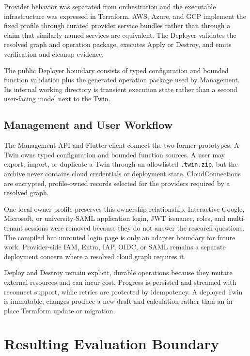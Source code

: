 Provider behavior was separated from orchestration and the executable
infrastructure was expressed in Terraform. AWS, Azure, and GCP implement the
fixed profile through curated provider service bundles rather than through a
claim that similarly named services are equivalent. The Deployer validates the
resolved graph and operation package, executes Apply or Destroy, and emits
verification and cleanup evidence.

The public Deployer boundary consists of typed configuration and bounded
function validation plus the generated operation package used by Management.
Its internal working directory is transient execution state rather than a
second user-facing model next to the Twin.

\subsection{Management and User Workflow}
\label{sec:refactoring-management}

The Management API and Flutter client connect the two former prototypes. A
Twin owns typed configuration and bounded function sources. A user may export,
import, or duplicate a Twin through an allowlisted \texttt{.twin.zip}, but the
archive never contains cloud credentials or deployment state. CloudConnections
are encrypted, profile-owned records selected for the providers required by a
resolved graph.

One local owner profile preserves this ownership relationship. Interactive
Google, Microsoft, or university-SAML application login, JWT issuance, roles,
and multi-tenant sessions were removed because they do not answer the research
questions. The compiled but unrouted login page is only an adapter boundary for
future work. Provider-side IAM, Entra, IAP, OIDC, or SAML remains a separate
deployment concern where a resolved cloud graph requires it.

Deploy and Destroy remain explicit, durable operations because they mutate
external resources and can incur cost. Progress is persisted and streamed with
reconnect support, while retries are protected by idempotency. A deployed Twin
is immutable; changes produce a new draft and calculation rather than an
in-place Terraform update or migration.

\section{Resulting Evaluation Boundary}
\label{sec:transformation-evaluation-boundary}

